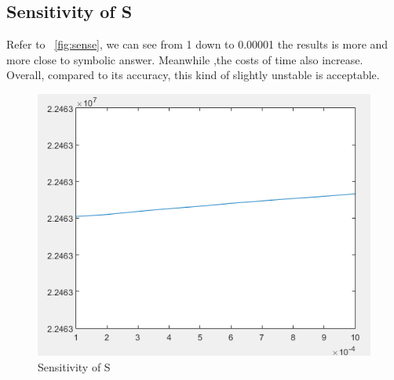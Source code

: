 \documentclass[
10pt, %
a4paper, %
oneside, %
headinclude,footinclude, %
BCOR5mm, %
]{scrartcl}
\theoremstyle{definition}
\begin{document}
\subsection{Sensitivity of S}
Refer to ~\vref{fig:sense}, we can see from 1 down to 0.00001 the results is more and more close to symbolic answer. Meanwhile ,the costs of time also increase. Overall, compared to its accuracy, this kind of slightly unstable is acceptable.
\begin{figure}[tb]
\centering
\includegraphics[width=.5\columnwidth]{./fig/sense.png} 


\caption[Sensitivity of S]{Sensitivity of S}
\label{fig:sense}

\end{figure}
\end{document}
